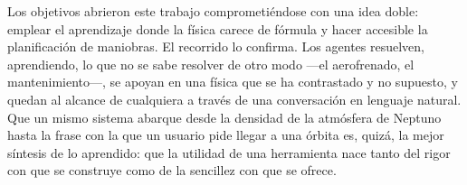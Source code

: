 
Los objetivos abrieron este trabajo comprometiéndose con una idea doble: emplear el aprendizaje donde la física carece de fórmula y hacer accesible la planificación de maniobras. El recorrido lo confirma. Los agentes resuelven, aprendiendo, lo que no se sabe resolver de otro modo ---el aerofrenado, el mantenimiento---, se apoyan en una física que se ha contrastado y no supuesto, y quedan al alcance de cualquiera a través de una conversación en lenguaje natural. Que un mismo sistema abarque desde la densidad de la atmósfera de Neptuno hasta la frase con la que un usuario pide llegar a una órbita es, quizá, la mejor síntesis de lo aprendido: que la utilidad de una herramienta nace tanto del rigor con que se construye como de la sencillez con que se ofrece.